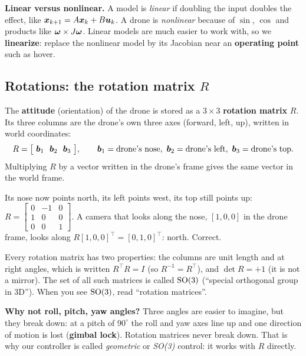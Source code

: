 \textbf{Linear versus nonlinear.} A model is \emph{linear} if doubling the input doubles the effect, like
$\bm{x}_{k+1}=A\bm{x}_k+B\bm{u}_k$. A drone is \emph{nonlinear} because of $\sin$, $\cos$ and products like $\bm{\omega}\times J\bm{\omega}$.
Linear models are much easier to work with, so we \textbf{linearize}: replace the nonlinear model by its Jacobian
near an \textbf{operating point} such as hover.

\subsection{Rotations: the rotation matrix $R$}
\label{sec:rotations}

The \textbf{attitude} (orientation) of the drone is stored as a $3\times3$ \textbf{rotation matrix} $R$. Its three
columns are the drone's own three axes (forward, left, up), written in world coordinates:
\[
R=\big[\ \vb_1\ \ \vb_2\ \ \vb_3\ \big],\qquad \vb_1=\text{drone's nose},\ \vb_2=\text{drone's left},\ \vb_3=\text{drone's top}.
\]
Multiplying $R$ by a vector written in the drone's frame gives the same vector in the world frame.
\begin{toy}
Its nose now points north, its left points west, its top still points up:
$R=\begin{bmatrix}0&-1&0\\1&0&0\\0&0&1\end{bmatrix}$.
A camera that looks along the nose, $[1,0,0]$ in the drone frame, looks along $R[1,0,0]^\top=[0,1,0]^\top$: north. Correct.
\end{toy}

Every rotation matrix has two properties: the columns are unit length and at right angles, which is written
$R^\top R=I$ (so $R^{-1}=R^\top$), and $\det R=+1$ (it is not a mirror). The set of all such matrices is called
$\mathrm{SO}(3)$ (``special orthogonal group in 3D''). When you see $\mathrm{SO}(3)$, read ``rotation matrices''.

\textbf{Why not roll, pitch, yaw angles?} Three angles are easier to imagine, but they break down: at a pitch of
$90^\circ$ the roll and yaw axes line up and one direction of motion is lost (\textbf{gimbal lock}). Rotation matrices
never break down. That is why our controller is called \emph{geometric} or \emph{SO(3)} control: it works with $R$
directly.


